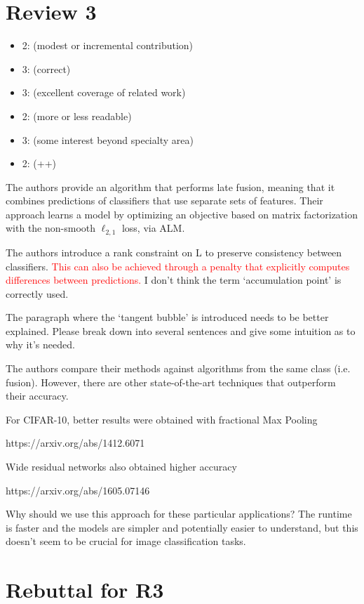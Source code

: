 \documentclass[letterpaper]{article}
\def\yanred{\textcolor{red}}
\def\yanred{\textcolor{red}}
\begin{document}
\section{Review 3}
\begin{itemize}
  \item 2: (modest or incremental contribution)
  \item 3: (correct)
  \item 3: (excellent coverage of related work)
  \item 2: (more or less readable)
  \item 3: (some interest beyond specialty area)
  \item 2: (++)
\end{itemize}

The authors provide an algorithm that performs late fusion, meaning that it combines predictions of classifiers that use separate sets of features. Their approach learns a model by optimizing an objective based on matrix factorization with the non-smooth $\ell_{2,1}$ loss, via ALM.

The authors introduce a rank constraint on L to preserve consistency between classifiers.
\yanred{This can also be achieved through a penalty that explicitly computes differences between predictions.}
I don’t think the term `accumulation point' is correctly used.

The paragraph where the `tangent bubble' is introduced needs to be better explained. Please break down into several sentences and give some intuition as to why it’s needed.

The authors compare their methods against algorithms from the same class (i.e. fusion). However, there are other state-of-the-art techniques that outperform their accuracy.

For CIFAR-10, better results were obtained with fractional Max Pooling

https://arxiv.org/abs/1412.6071

Wide residual networks also obtained higher accuracy

https://arxiv.org/abs/1605.07146

Why should we use this approach for these particular applications?
The runtime is faster and the models are simpler and potentially easier to understand, but this doesn’t seem to be crucial for image classification tasks.

\section{Rebuttal for R3}
\end{document}
